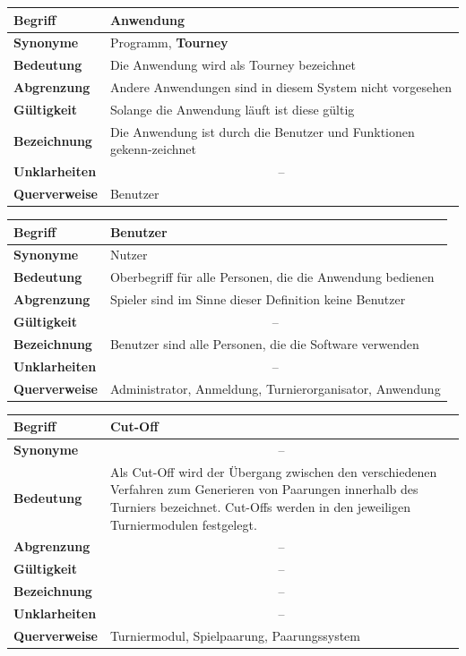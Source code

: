 \documentclass[11pt]{article}
\begin{document}
\newpage

\begin{tabularx}{\textwidth}{| p{} | p{} |}
	\hline
	\textbf{Begriff} & Anwendung\\
	\hline
	\textbf{Synonyme} & Programm, \textbf{Tourney}\\
	\hline
	\textbf{Bedeutung} & Die Anwendung wird als Tourney bezeichnet\\
	\hline
	\textbf{Abgrenzung} & Andere Anwendungen sind in diesem System nicht vorgesehen\\
	\hline
	\textbf{Gültigkeit} & Solange die Anwendung läuft ist diese gültig\\
	\hline
	\textbf{Bezeichnung} & Die Anwendung ist durch die Benutzer und Funktionen gekenn-zeichnet\\
	\hline
	\textbf{Unklarheiten} & \multicolumn{1}{c|}{--} \\
	\hline
	\textbf{Querverweise} & Benutzer \\
	\hline
\end{tabularx}

\begin{tabularx}{\textwidth}{| p{} | p{} |}
	\hline
	\textbf{Begriff} & Benutzer\\
	\hline
	\textbf{Synonyme} & Nutzer\\
	\hline
	\textbf{Bedeutung} & Oberbegriff für alle Personen, die die Anwendung bedienen\\
	\hline
	\textbf{Abgrenzung} & Spieler sind im Sinne dieser Definition keine Benutzer \\
	\hline
	\textbf{Gültigkeit} & \multicolumn{1}{c|}{--} \\
	\hline
	\textbf{Bezeichnung} & Benutzer sind alle Personen, die die Software verwenden\\
	\hline
	\textbf{Unklarheiten} & \multicolumn{1}{c|}{--} \\
	\hline
	\textbf{Querverweise} & Administrator, Anmeldung, Turnierorganisator, Anwendung\\
	\hline
\end{tabularx}

\begin{tabularx}{\textwidth}{| p{} | p{} |}
	\hline
	\textbf{Begriff} & Cut-Off\\
	\hline
	\textbf{Synonyme} & \multicolumn{1}{c|}{--} \\
	\hline
	\textbf{Bedeutung} & Als Cut-Off wird der Übergang zwischen den verschiedenen Verfahren zum Generieren von Paarungen innerhalb des Turniers bezeichnet. Cut-Offs werden in den jeweiligen Turniermodulen festgelegt.\\
	\hline
	\textbf{Abgrenzung} & \multicolumn{1}{c|}{--} \\
	\hline
	\textbf{Gültigkeit} & \multicolumn{1}{c|}{--} \\
	\hline
	\textbf{Bezeichnung} & \multicolumn{1}{c|}{--} \\
	\hline
	\textbf{Unklarheiten} & \multicolumn{1}{c|}{--} \\
	\hline
	\textbf{Querverweise} & Turniermodul, Spielpaarung, Paarungssystem\\
	\hline
\end{tabularx}
\end{document}
